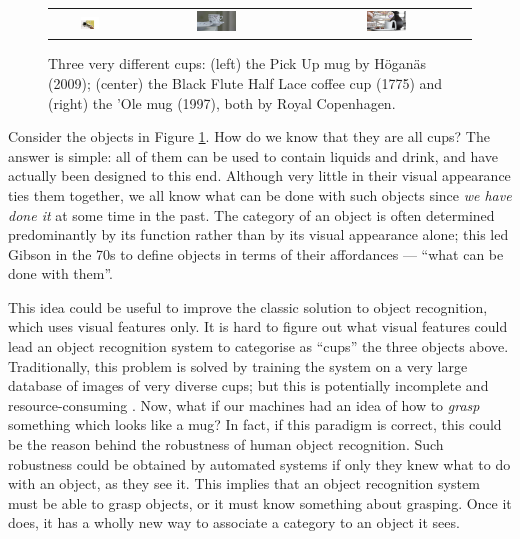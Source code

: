 \begin{figure} \centering
  \begin{tabular}{ccc}
    \includegraphics[width=0.25\textwidth]{images/pickup_press.pdf} &
    \includegraphics[width=0.25\textwidth]{images/black-fluted-half-lace-2.pdf} &
    \includegraphics[width=0.25\textwidth]{images/ole-at-opera-3.pdf} \\
  \end{tabular}
  \caption{Three very different cups: (left) the Pick Up mug by H\"ogan\"as (2009);
          (center) the Black Flute Half Lace coffee cup (1775) and (right) the
          'Ole mug (1997), both by Royal Copenhagen.}
  \label{fig:chairs}
\end{figure}

Consider the objects in Figure \ref{fig:chairs}. How do we know that they are all
cups? The answer is simple: all of them can be used to contain liquids and drink,
and have actually been designed to this end. Although very little in
their visual appearance ties them together, we all know what can be done with such
objects since \emph{we have done it} at some time in the past. The category of an object
is often determined predominantly by its function rather than by its visual appearance
alone; this led Gibson in the 70s \cite{gibson1,gibson2} to define objects
in terms of their affordances --- ``what can be done with them''.

This idea could be useful to improve the classic solution to object recognition,
which uses visual features only. It is hard to figure out
what visual features could lead an object recognition system to categorise as
``cups'' the three objects above. Traditionally, this problem is solved by training
the system on a very large database of images of very diverse cups; but this is
potentially incomplete and resource-consuming \cite{leibe_etal_ijcv2008}.
Now, what if our machines had an idea
of how to \emph{grasp} something which looks like a mug? In fact, if this paradigm is
correct, this could be the reason behind the robustness of human object
recognition. Such robustness could be obtained by automated systems if only
they knew what to do with an object, as they see it. This implies that an
object recognition system must be able to grasp objects, or it must know something
about grasping. Once it does, it has a wholly new way to associate a category
to an object it sees.


